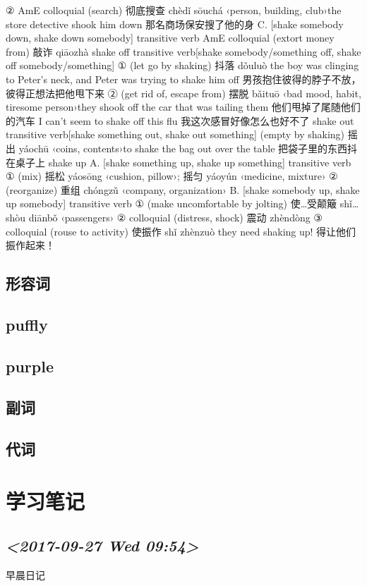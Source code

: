 \documentclass[11pt]{ctexart}
\begin{document}
{{{{② AmE colloquial (search) 彻底搜查 chèdǐ sōuchá ‹person, building, club›the store detective shook him down 那名商场保安搜了他的身
C. [shake somebody down, shake down somebody] transitive verb AmE colloquial (extort money from) 敲诈 qiāozhà shake off transitive verb[shake somebody/something off, shake off somebody/something]
① (let go by shaking) 抖落 dǒuluò the boy was clinging to Peter's neck, and Peter was trying to shake him off 男孩抱住彼得的脖子不放，彼得正想法把他甩下来
② (get rid of, escape from) 摆脱 bǎituō ‹bad mood, habit, tiresome person›they shook off the car that was tailing them 他们甩掉了尾随他们的汽车 I can't seem to shake off this flu 我这次感冒好像怎么也好不了 shake out transitive verb[shake something out, shake out something] (empty by shaking) 摇出 yáochū ‹coins, contents›to shake the bag out over the table 把袋子里的东西抖在桌子上 shake up
A. [shake something up, shake up something] transitive verb
① (mix) 摇松 yáosōng ‹cushion, pillow›; 摇匀 yáoyún ‹medicine, mixture›
② (reorganize) 重组 chóngzǔ ‹company, organization›
B. [shake somebody up, shake up somebody] transitive verb
① (make uncomfortable by jolting) 使…受颠簸 shǐ… shòu diānbǒ ‹passengers›
② colloquial (distress, shock) 震动 zhèndòng
③ colloquial (rouse to activity) 使振作 shǐ zhènzuò they need shaking up! 得让他们振作起来！

\subsection{形容词}
\label{sec:orgf46d360}
\subsection{puffly}
\label{sec:org90c45f5}
\subsection{purple}
\label{sec:org3c97cb7}
\subsection{副词}
\label{sec:org8d27473}
\subsection{代词}
\label{sec:org0363e93}
\section{学习笔记}
\label{sec:org6b87b0c}
\subsection{\textit{<2017-09-27 Wed 09:54>}}
\label{sec:orge86dc81}
早晨日记

}}}}
\end{document}
